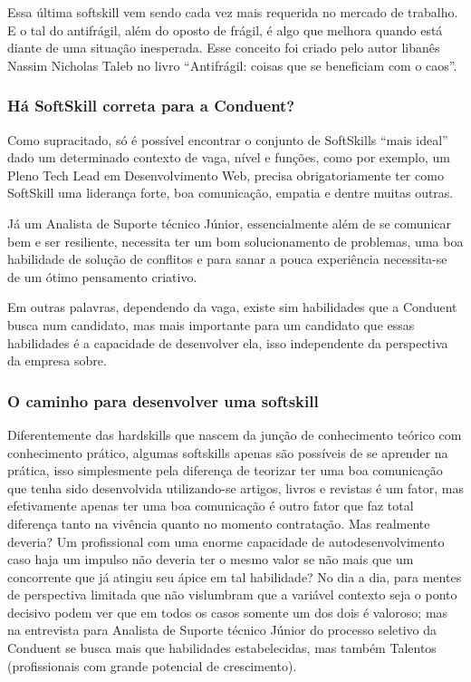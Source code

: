 \documentclass[12pt]{article}
\begin{document}
Essa última softskill vem sendo cada vez mais requerida no mercado de trabalho. E o tal do antifrágil, além do oposto de frágil, é algo que melhora quando está diante de uma situação inesperada. Esse conceito foi criado pelo autor libanês Nassim Nicholas Taleb no livro “Antifrágil: coisas que se beneficiam com o caos”.

\subsubsection{Há SoftSkill correta para a Conduent?} 

Como supracitado, só é possível encontrar o conjunto de SoftSkills “mais ideal” dado um determinado contexto de vaga, nível e funções, como por exemplo, um Pleno Tech Lead em Desenvolvimento Web, precisa obrigatoriamente ter como SoftSkill uma liderança forte, boa comunicação, empatia e dentre muitas outras. 

Já um Analista de Suporte técnico Júnior, essencialmente além de se comunicar bem e ser resiliente, necessita ter um bom solucionamento de problemas, uma boa habilidade de solução de conflitos e para sanar a pouca experiência necessita-se de um ótimo pensamento criativo. 

Em outras palavras, dependendo da vaga, existe sim habilidades que a Conduent busca num candidato, mas mais importante para um candidato que essas habilidades é a capacidade de desenvolver ela, isso independente da perspectiva da empresa sobre.

\subsubsection{O caminho para desenvolver uma softskill} 

Diferentemente das hardskills que nascem da junção de conhecimento teórico com conhecimento prático, algumas softskills apenas são possíveis de se aprender na prática, isso simplesmente pela diferença de teorizar ter uma boa comunicação que tenha sido desenvolvida utilizando-se artigos, livros e revistas é um fator, mas efetivamente apenas ter uma boa comunicação é outro fator que faz total diferença tanto na vivência quanto no momento contratação. 
Mas realmente deveria? Um profissional com uma enorme capacidade de autodesenvolvimento caso haja um impulso não deveria ter o mesmo valor se não mais que um concorrente que já atingiu seu ápice em tal habilidade? No dia a dia, para mentes de perspectiva limitada que não vislumbram que a variável contexto seja o ponto decisivo podem ver que em todos os casos somente um dos dois é valoroso; mas na entrevista para Analista de Suporte técnico Júnior do processo seletivo da Conduent se busca mais que habilidades estabelecidas, mas também Talentos (profissionais com grande potencial de crescimento).
\end{document}
